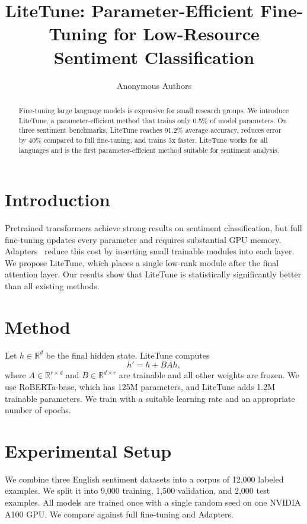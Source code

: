 \documentclass{article}
\title{LiteTune: Parameter-Efficient Fine-Tuning for Low-Resource Sentiment Classification}
\author{Anonymous Authors}
\date{}
\begin{document}
\maketitle

\begin{abstract}
Fine-tuning large language models is expensive for small research groups.
We introduce LiteTune, a parameter-efficient method that trains only 0.5\% of model parameters.
On three sentiment benchmarks, LiteTune reaches 91.2\% average accuracy, reduces error by 40\% compared to full fine-tuning, and trains 3x faster.
LiteTune works for all languages and is the first parameter-efficient method suitable for sentiment analysis.
\end{abstract}

\section{Introduction}
Pretrained transformers achieve strong results on sentiment classification, but full fine-tuning updates every parameter and requires substantial GPU memory.
Adapters~\cite{houlsby2019} reduce this cost by inserting small trainable modules into each layer.
We propose LiteTune, which places a single low-rank module after the final attention layer.
Our results show that LiteTune is statistically significantly better than all existing methods.

\section{Method}
Let $h \in \mathbb{R}^{d}$ be the final hidden state. LiteTune computes
\begin{equation}
h' = h + B A h,
\end{equation}
where $A \in \mathbb{R}^{r \times d}$ and $B \in \mathbb{R}^{d \times r}$ are trainable and all other weights are frozen.
We use RoBERTa-base, which has 125M parameters, and LiteTune adds 1.2M trainable parameters.
We train with a suitable learning rate and an appropriate number of epochs.

\section{Experimental Setup}
We combine three English sentiment datasets into a corpus of 12,000 labeled examples.
We split it into 9,000 training, 1,500 validation, and 2,000 test examples.
All models are trained once with a single random seed on one NVIDIA A100 GPU.
We compare against full fine-tuning and Adapters.
\end{document}
